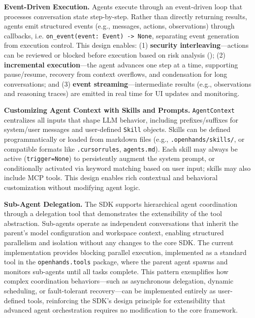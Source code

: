 \textbf{Event-Driven Execution.}
Agents execute through an event-driven loop that processes conversation state step-by-step. Rather than directly returning results, agents emit structured events (e.g., messages, actions, observations) through callbacks, i.e. \texttt{on\_event(event: Event) -> None}, separating event generation from execution control. This design enables: (1) \textbf{security interleaving}—actions can be reviewed or blocked before execution based on risk analysis (); (2) \textbf{incremental execution}—the agent advances one step at a time, supporting pause/resume, recovery from context overflows, and condensation for long conversations; and (3) \textbf{event streaming}—intermediate results (e.g., observations and reasoning traces) are emitted in real time for UI updates and monitoring. 


\textbf{Customizing Agent Context with Skills and Prompts.}
\texttt{AgentContext} centralizes all inputs that shape LLM behavior, including prefixes/suffixes for system/user messages and user-defined \texttt{Skill} objects. 
Skills can be defined programmatically or loaded from markdown files (e.g., \texttt{.openhands/skills/}, or compatible formats like \texttt{.cursorrules}, \texttt{agents.md}). 
Each skill may always be active (\texttt{trigger=None}) to persistently augment the system prompt, or conditionally activated via keyword matching based on user input; skills may also include MCP tools. 
This design enables rich contextual and behavioral customization without modifying agent logic.

\textbf{Sub-Agent Delegation.}
The SDK supports hierarchical agent coordination through a delegation tool that demonstrates the extensibility of the tool abstraction. 
Sub-agents operate as independent conversations that inherit the parent’s model configuration and workspace context, enabling structured parallelism and isolation without any changes to the core SDK. 
The current implementation provides blocking parallel execution, implemented as a standard tool in the \texttt{openhands.tools} package, where the parent agent spawns and monitors sub-agents until all tasks complete. 
This pattern exemplifies how complex coordination behaviors—such as asynchronous delegation, dynamic scheduling, or fault-tolerant recovery—can be implemented entirely as user-defined tools, reinforcing the SDK’s design principle for extensibility that advanced agent orchestration requires no modification to the core framework.

